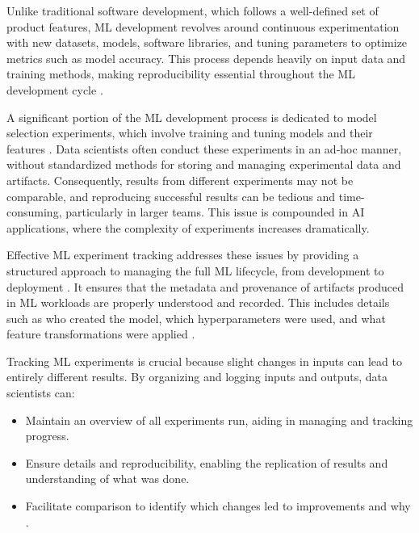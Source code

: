 Unlike traditional software development, which follows a well-defined set of product features, ML development revolves around continuous experimentation with new datasets, models, software libraries, and tuning parameters to optimize metrics such as model accuracy. This process depends heavily on input data and training methods, making reproducibility essential throughout the ML development cycle \cite{zaharia2018accelerating}.

A significant portion of the ML development process is dedicated to model selection experiments, which involve training and tuning models and their features \cite{schelter2017automatically}. Data scientists often conduct these experiments in an ad-hoc manner, without standardized methods for storing and managing experimental data and artifacts. Consequently, results from different experiments may not be comparable, and reproducing successful results can be tedious and time-consuming, particularly in larger teams. This issue is compounded in AI applications, where the complexity of experiments increases dramatically.

Effective ML experiment tracking addresses these issues by providing a structured approach to managing the full ML lifecycle, from development to deployment \cite{zaharia2018accelerating}. It ensures that the metadata and provenance of artifacts produced in ML workloads are properly understood and recorded. This includes details such as who created the model, which hyperparameters were used, and what feature transformations were applied \cite{schelter2017automatically}.

Tracking ML experiments is crucial because slight changes in inputs can lead to entirely different results. By organizing and logging inputs and outputs, data scientists can:

\begin{itemize}
    \item Maintain an overview of all experiments run, aiding in managing and tracking progress.
    \item Ensure details and reproducibility, enabling the replication of results and understanding of what was done.
    \item Facilitate comparison to identify which changes led to improvements and why \cite{wandb2023}.
\end{itemize}

